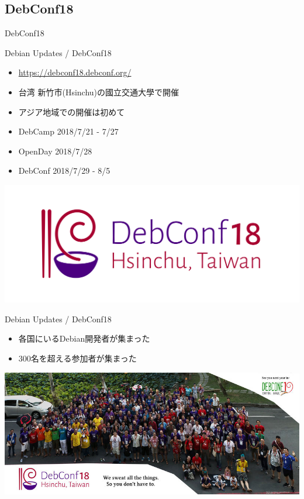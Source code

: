 \documentclass[cjk,dvipdfmx,10pt,compress,%
hyperref={bookmarks=true,bookmarksnumbered=true,bookmarksopen=false,%
colorlinks=false,%
pdftitle={第 132 回 関西 Debian 勉強会},%
pdfauthor={かわだ},%
pdfsubject={資料},%
}]{beamer}
\begin{document}
\subsection{DebConf18}
\begin{frame}
  \begin{center}\Huge{DebConf18}\end{center}
\end{frame}
\begin{frame}{Debian Updates / DebConf18}%
\begin{itemize}
\item \url{https://debconf18.debconf.org/}
\item 台湾 新竹市(Hsinchu)の國立交通大學で開催
\item アジア地域での開催は初めて
\item DebCamp 2018/7/21 - 7/27
\item OpenDay 2018/7/28
\item DebConf 2018/7/29 - 8/5
\end{itemize}
\includegraphics[scale=1.0]{image201810/DebConf18_Horizontal_Logo.png}
\end{frame}

\begin{frame}{Debian Updates / DebConf18}%
\begin{itemize}
\item 各国にいるDebian開発者が集まった
\item 300名を超える参加者が集まった
\end{itemize}
\includegraphics[scale=0.4,bb=0 0 800 331]{image201810/800px-Debconf18_group_photo.jpg}
\end{frame}
\end{document}
